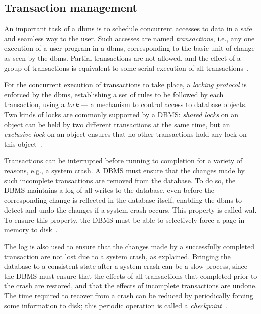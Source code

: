 \subsection{Transaction management}
\label{sec:trans-manag}
An important task of a \gls{dbms} is to schedule concurrent accesses to data in
a safe and seamless way to the user. Such accesses are named
\emph{transactions}, i.e., any one execution of a user program in a \gls{dbms},
corresponding to the basic unit of change as seen by the \gls{dbms}. Partial
transactions are not allowed, and the effect of a group of transactions is
equivalent to some serial execution of all transactions~\cite{ramakrishnan2003database}.

For the concurrent execution of transactions to take place, a \emph{locking
  protocol} is enforced by the \gls{dbms}, establishing a set of rules to be
followed by each transaction, using a \emph{lock} --- a mechanism to control
access to database objects.
Two kinds of locks are commonly supported by a DBMS: \emph{shared locks} on an
object can be held by two different transactions at the same time, but an
\emph{exclusive lock} on an object ensures that no other transactions hold any
lock on this object~\cite{ramakrishnan2003database}.

Transactions can be interrupted before running to completion for a variety of
reasons, e.g., a system crash. A DBMS must ensure that the changes made by such
incomplete transactions are removed from the database. To do so, the DBMS
maintains a log of all writes to the database, even before
the corresponding change is reflected in the database itself, enabling the
\gls{dbms} to detect and undo the changes if a system crash occurs. This property is called \gls{wal}. To ensure this property, the
DBMS must be able to selectively force a page in memory to disk~\cite{ramakrishnan2003database}.

The log is also used to ensure that the changes made by a successfully completed
transaction are not lost due to a system crash, as explained. Bringing
the database to a consistent state after a system crash can be a slow process,
since the DBMS must ensure that the effects of all transactions that completed
prior to the crash are restored, and that the effects of incomplete transactions
are undone. The time required to recover from a crash can be reduced by
periodically forcing some information to disk; this periodic operation is called a \emph{checkpoint}~\cite{ramakrishnan2003database}.

